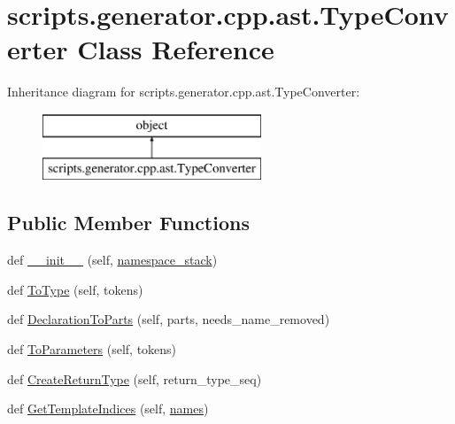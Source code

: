 \hypertarget{classscripts_1_1generator_1_1cpp_1_1ast_1_1_type_converter}{}\section{scripts.\+generator.\+cpp.\+ast.\+Type\+Converter Class Reference}
\label{classscripts_1_1generator_1_1cpp_1_1ast_1_1_type_converter}
Inheritance diagram for scripts.\+generator.\+cpp.\+ast.\+Type\+Converter\+:\begin{figure}[H]
\begin{center}
\leavevmode
\includegraphics[height=2.000000cm]{d8/d37/classscripts_1_1generator_1_1cpp_1_1ast_1_1_type_converter}
\end{center}
\end{figure}
\subsection*{Public Member Functions}
\begin{DoxyCompactItemize}
\item 
def \mbox{\hyperlink{classscripts_1_1generator_1_1cpp_1_1ast_1_1_type_converter_ada997c1f3bb82d55335a8985a08a23aa}{\+\_\+\+\_\+init\+\_\+\+\_\+}} (self, \mbox{\hyperlink{classscripts_1_1generator_1_1cpp_1_1ast_1_1_type_converter_a4d4cfee01c25ca73fb68ae5d7d3ca7a2}{namespace\+\_\+stack}})
\item 
def \mbox{\hyperlink{classscripts_1_1generator_1_1cpp_1_1ast_1_1_type_converter_a9620d0346172552be9b3de34cb11ecf4}{To\+Type}} (self, tokens)
\item 
def \mbox{\hyperlink{classscripts_1_1generator_1_1cpp_1_1ast_1_1_type_converter_a496f63ee6ca025dbf9725e7513a7fb0b}{Declaration\+To\+Parts}} (self, parts, needs\+\_\+name\+\_\+removed)
\item 
def \mbox{\hyperlink{classscripts_1_1generator_1_1cpp_1_1ast_1_1_type_converter_a7a4eeda92f128c04ccceb912c8bb15df}{To\+Parameters}} (self, tokens)
\item 
def \mbox{\hyperlink{classscripts_1_1generator_1_1cpp_1_1ast_1_1_type_converter_accc0056fb0f360a774a56370ac55c75b}{Create\+Return\+Type}} (self, return\+\_\+type\+\_\+seq)
\item 
def \mbox{\hyperlink{classscripts_1_1generator_1_1cpp_1_1ast_1_1_type_converter_a38711b7eecda94eadce0b39e8363f9ed}{Get\+Template\+Indices}} (self, \mbox{\hyperlink{_mutual_8h_a78a6dba1026eca68e2950c3857634cb3}{names}})
\end{DoxyCompactItemize}
